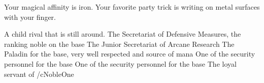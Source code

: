 \documentclass[char]{guildcamp3}
\begin{document}
\begin{itemz}[Notes]
	\item Your magical affinity is iron. Your favorite party trick is writing on metal surfaces with your finger.
\end{itemz}

\begin{contacts}
  \contact{\cMageTwo{}} A child rival that is still around.
  \contact{\cNobleOne{}} The Secretariat of Defensive Measures, the ranking noble on the base
  \contact{\cNobleTwo{}} The Junior Secretariat of Arcane Research
  \contact{\cPaladin{}} The Paladin for the base, very well respected and source of mana 
  \contact{\cRogueOne{}} One of the security personnel for the base
  \contact{\cRogueTwo{}} One of the security personnel for the base
  \contact{\cServant{}} The loyal servant of /cNobleOne{} 
\end{contacts}
\end{document}

